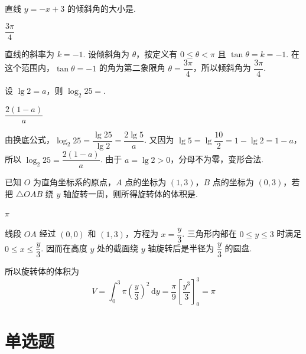 \documentclass[UTF8,a4paper,oneside,11pt]{ctexbook}
\begin{document}
\begin{problem}

直线 \(y=-x+3\) 的倾斜角的大小是\fillinblank{}.

\begin{answer}
\(\dfrac{3\pi}{4}\)
\end{answer}

\begin{solution}
直线的斜率为 \(k=-1\). 设倾斜角为 \(\theta\)，按定义有 \(0\leqslant\theta<\pi\) 且 \(\tan\theta=k=-1\). 在这个范围内，\(\tan\theta=-1\) 的角为第二象限角 \(\theta=\dfrac{3\pi}{4}\)，所以倾斜角为 \(\dfrac{3\pi}{4}\).
\end{solution}
\end{problem}

\begin{problem}

设 \(\lg 2=a\)，则 \(\log_2 25=\)\fillinblank{}.

\begin{answer}
\(\dfrac{2(1-a)}{a}\)
\end{answer}

\begin{solution}
由换底公式，\(\log_2 25=\dfrac{\lg25}{\lg2}=\dfrac{2\lg5}{a}\). 又因为 \(\lg5=\lg\dfrac{10}{2}=1-\lg2=1-a\)，所以 \(\log_2 25=\dfrac{2(1-a)}{a}\). 由于 \(a=\lg2>0\)，分母不为零，变形合法.
\end{solution}
\end{problem}

\begin{problem}

已知 \(O\) 为直角坐标系的原点，\(A\) 点的坐标为 \((1,3)\)，\(B\) 点的坐标为 \((0,3)\)，若把 \(\triangle OAB\) 绕 \(y\) 轴旋转一周，则所得旋转体的体积是\fillinblank{}.

\begin{answer}
\(\pi\)
\end{answer}

\begin{solution}
线段 \(OA\) 经过 \((0,0)\) 和 \((1,3)\)，方程为 \(x=\dfrac{y}{3}\). 三角形内部在 \(0\leqslant y\leqslant3\) 时满足 \(0\leqslant x\leqslant\dfrac{y}{3}\). 因而在高度 \(y\) 处的截面绕 \(y\) 轴旋转后是半径为 \(\dfrac{y}{3}\) 的圆盘.

所以旋转体的体积为
\[
V=\int_0^3\pi\left(\frac{y}{3}\right)^2\,\mathrm{d}y=\frac{\pi}{9}\left[\frac{y^3}{3}\right]_0^3=\pi
\]
\end{solution}
\end{problem}

\section{单选题}
\end{document}
